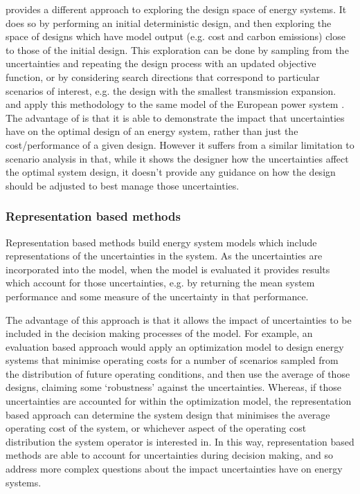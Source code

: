  provides a different approach to exploring the design space of energy systems. It does so by performing an initial deterministic design, and then exploring the space of designs which have model output (e.g. cost and carbon emissions) close to those of the initial design. This exploration can be done by sampling from the uncertainties and repeating the design process with an updated objective function, or by considering search directions that correspond to particular scenarios of interest, e.g. the design with the smallest transmission expansion.  and  apply this methodology to the same model of the European power system . The advantage of  is that it is able to demonstrate the impact that uncertainties have on the optimal design of an energy system, rather than just the cost/performance of a given design. However it suffers from a similar limitation to scenario analysis in that, while it shows the designer how the uncertainties affect the optimal system design, it doesn't provide any guidance on how the design should be adjusted to best manage those uncertainties.


\subsubsection{Representation based methods}

Representation based methods build energy system models which include representations of the uncertainties in the system. As the uncertainties are incorporated into the model, when the model is evaluated it provides results which account for those uncertainties, e.g. by returning the mean system performance and some measure of the uncertainty in that performance.

The advantage of this approach is that it allows the impact of uncertainties to be included in the decision making processes of the model. For example, an evaluation based approach would apply an optimization model to design energy systems that minimise operating costs for a number of scenarios sampled from the distribution of future operating conditions, and then use the average of those designs, claiming some `robustness' against the uncertainties. Whereas, if those uncertainties are accounted for within the optimization model, the representation based approach can determine the system design that minimises the average operating cost of the system, or whichever aspect of the operating cost distribution the system operator is interested in. In this way, representation based methods are able to account for uncertainties during decision making, and so address more complex questions about the impact uncertainties have on energy systems.

